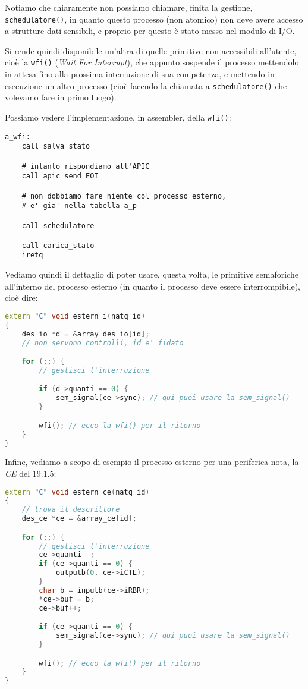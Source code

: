 \documentclass[a4paper,11pt]{article}
\begin{document}
Notiamo che chiaramente non possiamo chiamare, finita la gestione, \lstinline|schedulatore()|, in quanto questo processo (non atomico) non deve avere accesso a strutture dati sensibili, e proprio per questo è stato messo nel modulo di I/O.

Si rende quindi disponibile un'altra di quelle primitive non accessibili all'utente, cioè la \lstinline|wfi()| (\textit{Wait For Interrupt}), che appunto sospende il processo mettendolo in attesa fino alla prossima interruzione di sua competenza, e mettendo in esecuzione un altro processo (cioè facendo la chiamata a \lstinline|schedulatore()| che volevamo fare in primo luogo).

Possiamo vedere l'implementazione, in assembler, della \lstinline|wfi()|:
\begin{lstlisting}	
a_wfi:
	call salva_stato
	
	# intanto rispondiamo all'APIC
	call apic_send_EOI

	# non dobbiamo fare niente col processo esterno, 
	# e' gia' nella tabella a_p
	
	call schedulatore

	call carica_stato
	iretq
\end{lstlisting}

Vediamo quindi il dettaglio di poter usare, questa volta, le primitive semaforiche all'interno del processo esterno (in quanto il processo deve essere interrompibile), cioè dire:
\begin{lstlisting}[language=C++, style=codestyle]	
extern "C" void estern_i(natq id)
{
	des_io *d = &array_des_io[id];
	// non servono controlli, id e' fidato

	for (;;) {
		// gestisci l'interruzione

		if (d->quanti == 0) {
			sem_signal(ce->sync); // qui puoi usare la sem_signal()
		}

		wfi(); // ecco la wfi() per il ritorno
	}
}
\end{lstlisting}

Infine, vediamo a scopo di esempio il processo esterno per una periferica nota, la \textit{CE} del 19.1.5:
\begin{lstlisting}[language=C++, style=codestyle]	
extern "C" void estern_ce(natq id)
{
	// trova il descrittore
	des_ce *ce = &array_ce[id];

	for (;;) {
		// gestisci l'interruzione
		ce->quanti--;
		if (ce->quanti == 0) {
			outputb(0, ce->iCTL);
		}
		char b = inputb(ce->iRBR);
		*ce->buf = b;
		ce->buf++;

		if (ce->quanti == 0) {
			sem_signal(ce->sync); // qui puoi usare la sem_signal()
		}

		wfi(); // ecco la wfi() per il ritorno
	}
}
\end{lstlisting}
\end{document}

